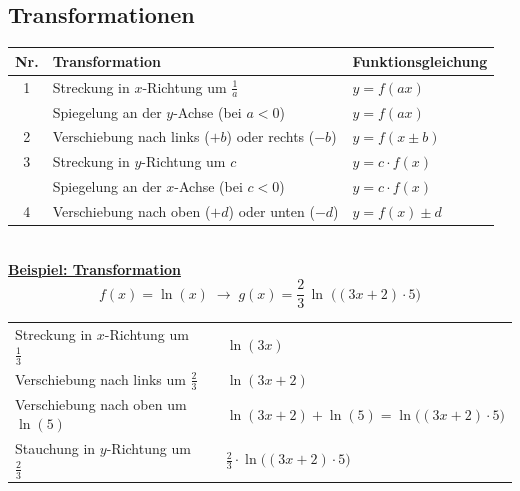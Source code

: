 \subsection{Transformationen}

\renewcommand{\arraystretch}{1.4}
\begin{tabular}{cll}
\textbf{Nr.} & \textbf{Transformation} & \textbf{Funktionsgleichung} \\ \hline
    1 & Streckung in $x$-Richtung um $\frac{1}{a}$          & $y = f(a x)$ \\
      & Spiegelung an der $y$-Achse (bei $a<0$)             & $y = f(a x)$ \\[0.3em]

    2 & Verschiebung nach links ($+b$) oder rechts ($-b$)   & $y = f(x \pm b)$ \\[0.3em]

    3 & Streckung in $y$-Richtung um $c$                    & $y = c \cdot f(x)$ \\
      & Spiegelung an der $x$-Achse (bei $c<0$)             & $y = c \cdot f(x)$ \\[0.3em]

    4 & Verschiebung nach oben ($+d$) oder unten ($-d$)     & $y = f(x) \pm d$
\end{tabular}\\

\renewcommand{\arraystretch}{0.5}
\underline{\textbf{Beispiel: Transformation}}\\
\[
f(x) = \ln(x) \;\longrightarrow\; g(x) = \frac{2}{3}\,\ln\;\bigl((3x+2)\cdot 5\bigr)
\]

\renewcommand{\arraystretch}{1.5}
\begin{tabular}{lll}
    Streckung in $x$-Richtung um $\frac{1}{3}$  &   & $\ln(3x)$ \\
    Verschiebung nach links um $\frac{2}{3}$    &   & $\ln(3x + 2)$ \\
    Verschiebung nach oben um $\ln(5)$          &   & $\ln(3x+2) + \ln(5) = \ln\bigl((3x+2)\cdot 5\bigr)$ \\
    Stauchung in $y$-Richtung um $\frac{2}{3}$  &   & $\displaystyle \frac{2}{3}\cdot \ln\bigl((3x+2)\cdot 5\bigr)$
\end{tabular}



